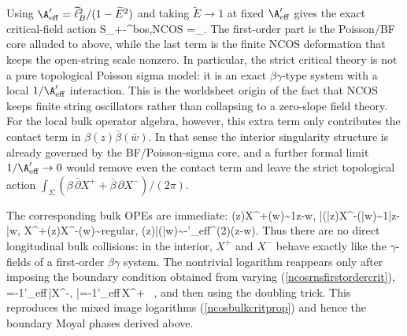 \documentclass[12pt]{article}
\newcommand{\wt}[1]{\widetilde{#1}}
\begin{document}
Using $\A'_{\rm eff}=\wt\ell_B^2/(1-\widetilde E^2)$ and taking $\widetilde E\to1$ at fixed $\A'_{\rm eff}$ gives the exact critical-field action
\ie\label{ncosrnsfirstordercrit}
S_{+-}^{\rm bos,NCOS}
=\int_.
\fe
The first-order part is the Poisson/BF core alluded to above, while the last term is the finite NCOS deformation that keeps the open-string scale nonzero. In particular, the strict critical theory is not a pure topological Poisson sigma model: it is an exact $\beta\gamma$-type system with a local $1/\A'_{\rm eff}$ interaction. This is the worldsheet origin of the fact that NCOS keeps finite string oscillators rather than collapsing to a zero-slope field theory. For the local bulk operator algebra, however, this extra term only contributes the contact term in $\beta(z)\bar\beta(\bar w)$. In that sense the interior singularity structure is already governed by the BF/Poisson-sigma core, and a further formal limit $1/\A'_{\rm eff}\to0$ would remove even the contact term and leave the strict topological action $\int_\Sigma (\beta\,\bar\partial X^+ + \bar\beta\,\partial X^-)/(2\pi)$.

The corresponding bulk OPEs are immediate:
\ie\label{ncosbetagammaope}
\beta(z)X^+(w)\sim {1\over z-w},\qquad
\bar\beta(\bar z)X^-(\bar w)\sim {1\over \bar z-\bar w},
\fe
\ie
X^+(z)X^-(w)\sim {\rm regular},\qquad
\beta(z)\bar\beta(\bar w)\sim -{\pi{}\A'_{\rm eff}}\delta^{(2)}(z-w).
\fe
Thus there are no direct longitudinal bulk collisions: in the interior, $X^+$ and $X^-$ behave exactly like the $\gamma$-fields of a first-order $\beta\gamma$ system. The nontrivial logarithm reappears only after imposing the boundary condition obtained from varying (\ref{ncosrnsfirstordercrit}),
\ie\label{ncosbetaboundary}
\beta=-{1\A'_{\rm eff}}\,\bar\partial X^-,
\qquad
\bar\beta=-{1\A'_{\rm eff}}\,\partial X^+
~\partial\Sigma,
\fe
and then using the doubling trick. This reproduces the mixed image logarithms (\ref{ncosbulkcritprop}) and hence the boundary Moyal phases derived above.
\end{document}

